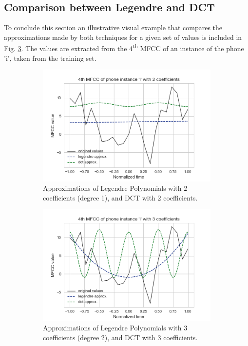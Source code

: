 \subsection{Comparison between Legendre and DCT}

To conclude this section an illustrative visual example that compares the approximations made
by both techniques for a given set of values is included in Fig. \ref{fig:dynamic_features_comparison}. The values are extracted from
the 4\textsuperscript{th} MFCC of an instance of the phone 'i', taken from the training set.

\begin{figure}[H]
  \centering
  \begin{subfigure}{.5\textwidth}
    \centering
    \captionsetup{width=.95\linewidth}
    \includegraphics[width=.95\linewidth]{files/figures/method/dynamic_features_2}
    \caption{Approximations of Legendre Polynomials with 2 coefficients (degree 1),
    and DCT with 2 coefficients.}
    \label{fig:dynamic_features_1}
  \end{subfigure}%
  \begin{subfigure}{.5\textwidth}
    \centering
    \captionsetup{width=.95\linewidth}
    \includegraphics[width=.95\linewidth]{files/figures/method/dynamic_features_3}
    \caption{Approximations of Legendre Polynomials with 3 coefficients (degree 2),
    and DCT with 3 coefficients.}
    \label{fig:sub2}
  \end{subfigure}
  \caption{}
  \label{fig:dynamic_features_comparison}
\end{figure}

